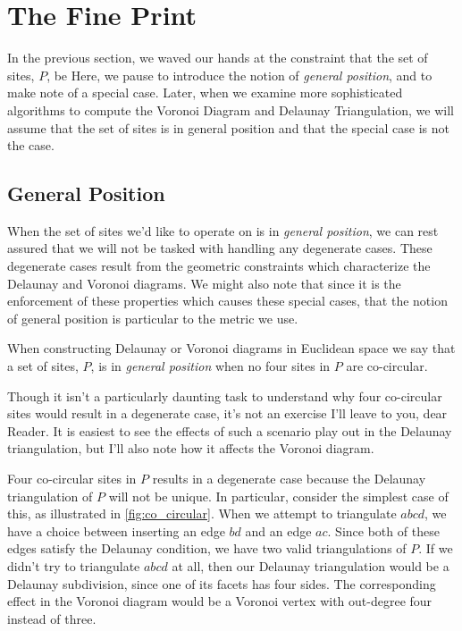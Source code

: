 \documentclass[12pt,twoside]{reedthesis}
\begin{document}
  \section{The Fine Print}
  \label{sec:the_fine_print}
    In the previous section, we waved our hands at the constraint that the set of sites, $P$, be  Here, we pause to introduce the notion of \emph{general position}, and to make note of a special case. Later, when we examine more sophisticated algorithms to compute the Voronoi Diagram and Delaunay Triangulation, we will assume that the set of sites is in general position and that the special case is not the case.
    \subsection{General Position} %
    \label{sub:general_position}
    
      When the set of sites we'd like to operate on is in \emph{general position}, we can rest assured that we will not be tasked with handling any degenerate cases. These degenerate cases result from the geometric constraints which characterize the Delaunay and Voronoi diagrams. We might also note that since it is the enforcement of these properties which causes these special cases, that the notion of general position is particular to the metric we use.\par

      When constructing Delaunay or Voronoi diagrams in Euclidean space we say that a set of sites, $P$, is in \emph{general position} when no four sites in $P$ are co-circular.

      Though it isn't a particularly daunting task to understand why four co-circular sites would result in a degenerate case, it's not an exercise I'll leave to you, dear Reader. It is easiest to see the effects of such a scenario play out in the Delaunay triangulation, but I'll also note how it affects the Voronoi diagram. \par

      Four co-circular sites in $P$ results in a degenerate case because the Delaunay triangulation of $P$ will not be unique. In particular, consider the simplest case of this, as illustrated in \cref{fig:co_circular}. When we attempt to triangulate $abcd$, we have a choice between inserting an edge $bd$ and an edge $ac$. Since both of these edges satisfy the Delaunay condition, we have two valid triangulations of $P$. If we didn't try to triangulate $abcd$ at all, then our Delaunay triangulation would be a Delaunay subdivision, since one of its facets has four sides. The corresponding effect in the Voronoi diagram would be a Voronoi vertex with out-degree four instead of three. 
\end{document}
